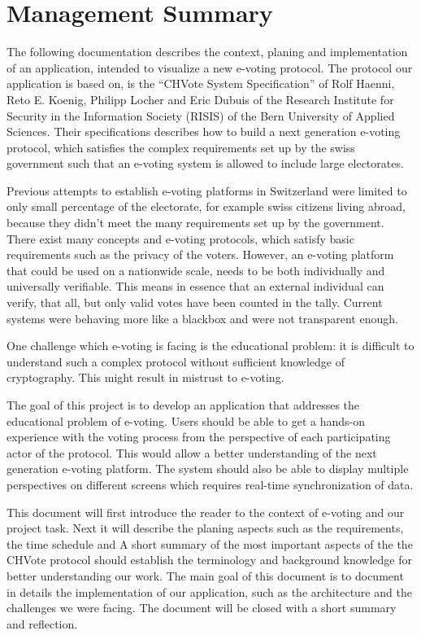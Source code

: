 \chapter*{Management Summary}
The following documentation describes the context, planing and implementation of an application, intended to visualize a new e-voting protocol. The protocol our application is based on, is the "`CHVote System Specification"' of Rolf Haenni, Reto E. Koenig, Philipp Locher and Eric Dubuis of the Research Institute for Security in the Information Society (RISIS) of the Bern University of Applied Sciences. Their specifications describes how to build a next generation e-voting protocol, which satisfies the complex requirements set up by the swiss government such that an e-voting system is allowed to include large electorates.

Previous attempts to establish e-voting platforms in Switzerland were limited to only small percentage of the electorate, for example swiss citizens living abroad, because they didn't meet the many requirements set up by the government. There exist many concepts and e-voting protocols, which satisfy basic requirements such as the privacy of the voters. However, an e-voting platform that could be used on a nationwide scale, needs to be both individually and universally verifiable. This means in essence that an external individual can verify, that all, but only valid votes have been counted in the tally. Current systems were behaving more like a blackbox and were not transparent enough.

One challenge which e-voting is facing is the educational problem: it is difficult to understand such a complex protocol without sufficient knowledge of cryptography. This might result in mistrust to e-voting. 

The goal of this project is to develop an application that addresses the educational problem of e-voting. Users should be able to get a hands-on experience with the voting process from the perspective of each participating actor of the protocol. This would allow a better understanding of the next generation e-voting platform. The system should also be able to display multiple perspectives on different screens which requires real-time synchronization of data.

This document will first introduce the reader to the context of e-voting and our project task. 
Next it will describe the planing aspects such as the requirements, the time schedule and 
A short summary of the most important aspects of the the CHVote protocol should establish the terminology and background knowledge for better understanding our work. The main goal of this document is to document in details the implementation of our application, such as the architecture and the challenges we were facing. The document will be closed with a short summary and reflection.